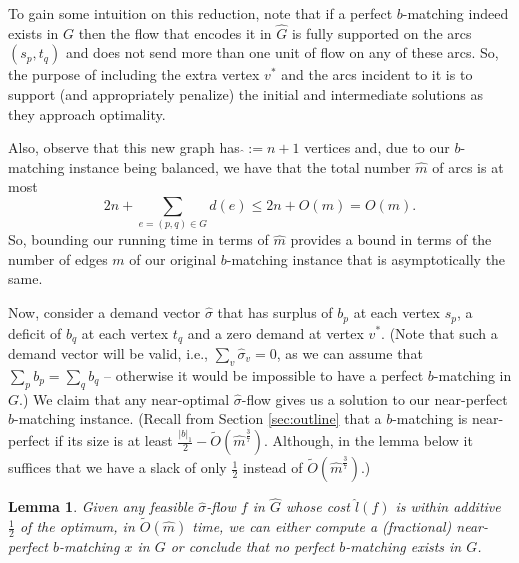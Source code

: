 \documentclass[11pt, letterpaper]{article}
\newtheorem{lemma}[theorem]{Lemma}
\newcommand{\onorm}[1]{|#1|_{1}}
\newcommand{\tO}[1]{\widetilde{O}(#1)}
\newcommand{\cG}{{G}}
\newcommand{\hG}{\widehat{G}}
\newcommand{\hm}{\widehat{m}}
\newcommand{\cm}{{m}}
\newcommand{\hn}{\hat{}}
\newcommand{\hsigma}{\hat{\sigma}}
\newcommand{\hvsigma}{\boldsymbol{\mathit{\hat{\sigma}}}}
\newcommand{\bb}{\boldsymbol{\mathit{b}}}
\newcommand{\ff}{\boldsymbol{\mathit{f}}}
\newcommand{\hll}{\boldsymbol{\mathit{\hat{l}}}}
\newcommand{\xx}{\boldsymbol{\mathit{x}}}
\begin{document}
To gain some intuition on this reduction, note that if a perfect $\bb$-matching indeed exists in $\cG$ then the flow that encodes it in $\hG$ is fully supported on the arcs $(s_p,t_q)$ and does not send more than one unit of flow on any of these arcs. So, the purpose of including the extra vertex $v^*$ and the arcs incident to it is to support (and appropriately penalize) the initial and intermediate solutions as they approach optimality.  

Also, observe that this new graph has $\hn:=n+1$ vertices and, due to our $\bb$-matching instance being balanced, we have that the total number $\hm$ of arcs is at most
\[
2n+\sum_{e=(p,q)\in \cG} d(e)\leq 2n+O(\cm) = O(\cm).
\]
So, bounding our running time in terms of $\hm$ provides a bound in terms of the number of edges $\cm$ of our original $\bb$-matching instance that is asymptotically the same. 

Now, consider a demand vector $\hvsigma$ that has surplus of $b_p$ at each vertex $s_p$, a deficit of $b_q$ at each vertex $t_q$ and a zero demand at vertex $v^*$. (Note that such a demand vector will be valid, i.e., $\sum_v \hsigma_v=0$, as we can assume that $\sum_p b_p=\sum_q b_q$ -- otherwise it would be impossible to have a perfect $\bb$-matching in $\cG$.) We claim that any near-optimal $\hvsigma$-flow gives us a solution to our near-perfect $\bb$-matching instance. (Recall from Section \ref{sec:outline} that a $\bb$-matching is near-perfect if its size is at least $\frac{\onorm{\bb}}{2}-\tO{\hm^{\frac{3}{7}}}$. Although, in the lemma below it suffices that we have a slack of only $\frac{1}{2}$ instead of $\tO{\hm^{\frac{3}{7}}}$.)

\begin{lemma}\label{lem:mincost_to_matchings}
Given any feasible $\hvsigma$-flow $\ff$ in $\hG$ whose cost $\hll(\ff)$ is within additive $\frac{1}{2}$ of the optimum, in $\tO{\hm}$ time, we can either compute a (fractional) near-perfect $\bb$-matching $\xx$ in $\cG$ or conclude that no perfect $\bb$-matching exists in $\cG$. 
\end{lemma} 
\end{document}
